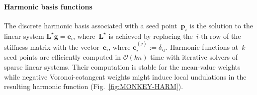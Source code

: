 \documentclass[acmtog,authorversion]{acmart}
\begin{document}
\paragraph{Harmonic basis functions}
The discrete harmonic basis associated with a seed point~$\mathbf{p}_{i}$ is the solution to the linear system \mbox{$\mathbf{L}^{\star}\mathbf{g}=\mathbf{e}_{i}$}, where~$\mathbf{L}^{\star}$ is achieved by replacing the~$i$-th row of the stiffness matrix with the vector~$\mathbf{e}_{i}$, where \mbox{$\mathbf{e}_{i}^{(j)}:=\delta_{ij}$}. Harmonic functions at~$k$ seed points are efficiently computed in \mbox{$\mathcal{O}(kn)$} time with iterative solvers of sparse linear systems. Their computation is stable for the mean-value weights~\citep{FLOATER2005} while negative Voronoi-cotangent weights might induce local undulations in the resulting harmonic function (Fig.~\ref{fig:MONKEY-HARM}).
%
\end{document}
